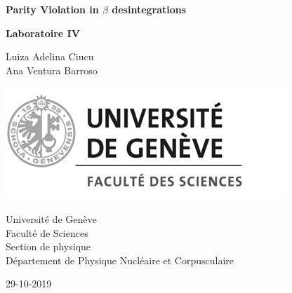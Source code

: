\documentclass[10pt,swedish, openany]{book}
\begin{document}

\begin{titlepage}
	\clearpage\thispagestyle{empty}
	\centering
	\vspace{2cm}

	{\large  \par}
	\vspace{8cm}
        {\Huge \textbf{Parity Violation in $\beta$ desintegrations}} \\
	\vspace{1cm}
	{\large \textbf{Laboratoire IV} \par}
	\vspace{2cm}
	{\large Luiza Adelina Ciucu \\ %
	             Ana Ventura Barroso \par}
	\vspace{4cm}

    \includegraphics[scale=0.75]{logo.jpg}
    
    \vspace{4cm}
    
	{\normalsize Universit\'e de Gen\`eve \\ 
		Facult\'e de Sciences \\
		Section de physique \\
		D\'epartement de Physique Nucl\'eaire et Corpusculaire \par}
		
	{\normalsize 29-10-2019 \par}
	\vspace{2cm}
	
	\pagebreak

\end{titlepage}

\tableofcontents{}

\clearpage

\listoffigures
\end{document}
